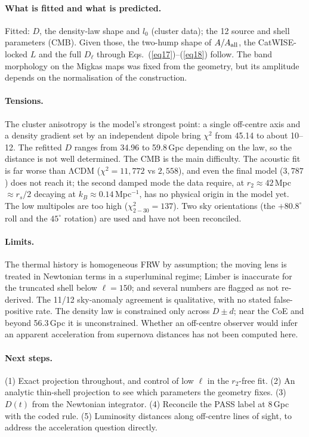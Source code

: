 \documentclass[10pt,twocolumn]{article}
\begin{document}
\paragraph{What is fitted and what is predicted.} Fitted: $D$, the density-law shape and $l_0$ (cluster data); the 12 source and shell parameters (CMB). Given those, the two-hump shape of $A/A_{\rm all}$, the CatWISE-locked $L$ and the full $D_\ell$ through Eqs.~(\ref{eq17})--(\ref{eq18}) follow. The band morphology on the Migkas maps was fixed from the geometry, but its amplitude depends on the normalisation of the construction.
\paragraph{Tensions.} The cluster anisotropy is the model's strongest point: a single off-centre axis and a density gradient set by an independent dipole bring $\chi^2$ from 45.14 to about 10--12. The refitted $D$ ranges from 34.96 to 59.8\,Gpc depending on the law, so the distance is not well determined. The CMB is the main difficulty. The acoustic fit is far worse than ΛCDM ($\chi^2=11{,}772$ vs $2{,}558$), and even the final model ($3{,}787$) does not reach it; the second damped mode the data require, at $r_2\approx42$\,Mpc $\approx r_s/2$ decaying at $k_B\approx0.14$\,Mpc$^{-1}$, has no physical origin in the model yet. The low multipoles are too high ($\chi^2_{2-30}=137$). Two sky orientations (the $+80.8^\circ$ roll and the $45^\circ$ rotation) are used and have not been reconciled.
\paragraph{Limits.} The thermal history is homogeneous FRW by assumption; the moving lens is treated in Newtonian terms in a superluminal regime; Limber is inaccurate for the truncated shell below $\ell=150$; and several numbers are flagged as not re-derived. The 11/12 sky-anomaly agreement is qualitative, with no stated false-positive rate. The density law is constrained only across $D\pm d$; near the CoE and beyond 56.3\,Gpc it is unconstrained. Whether an off-centre observer would infer an apparent acceleration from supernova distances has not been computed here.
\paragraph{Next steps.} (1) Exact projection throughout, and control of low $\ell$ in the $r_2$-free fit. (2) An analytic thin-shell projection to see which parameters the geometry fixes. (3) $D(t)$ from the Newtonian integrator. (4) Reconcile the PASS label at 8\,Gpc with the coded rule. (5) Luminosity distances along off-centre lines of sight, to address the acceleration question directly.
\end{document}
